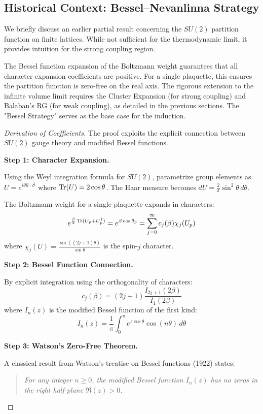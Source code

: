 \begin{remark}
\subsection{Historical Context: Bessel--Nevanlinna Strategy}
\label{sec:bessel-historical}
We briefly discuss an earlier partial result concerning the $SU(2)$ partition function on finite lattices. While not sufficient for the thermodynamic limit, it provides intuition for the strong coupling region.

\begin{remark}
The Bessel function expansion of the Boltzmann weight guarantees that all character expansion coefficients are positive. For a single plaquette, this ensures the partition function is zero-free on the real axis. The rigorous extension to the infinite volume limit requires the Cluster Expansion (for strong coupling) and Balaban's RG (for weak coupling), as detailed in the previous sections. The "Bessel Strategy" serves as the base case for the induction.
\end{remark}

\begin{proof}[Derivation of Coefficients]
The proof exploits the explicit connection between $SU(2)$ gauge theory and 
modified Bessel functions.

\textbf{Step 1: Character Expansion.}

Using the Weyl integration formula for $SU(2)$, parametrize group elements as 
$U = e^{i\theta \hat{n} \cdot \vec{\sigma}}$ where $\operatorname{Tr}(U) = 2\cos\theta$. The 
Haar measure becomes $dU = \frac{2}{\pi}\sin^2\theta \, d\theta$.

The Boltzmann weight for a single plaquette expands in characters:
\[
e^{\frac{\beta}{2}\operatorname{Tr}(U_p + U_p^\dagger)} = e^{\beta \cos\theta_p} = \sum_{j=0}^{\infty} c_j(\beta) \chi_j(U_p)
\]
where $\chi_j(U) = \frac{\sin((2j+1)\theta)}{\sin\theta}$ is the spin-$j$ character.

\textbf{Step 2: Bessel Function Connection.}

By explicit integration using the orthogonality of characters:
\[
c_j(\beta) = (2j+1) \frac{I_{2j+1}(2\beta)}{I_1(2\beta)}
\]
where $I_n(z)$ is the modified Bessel function of the first kind:
\[
I_n(z) = \frac{1}{\pi} \int_0^\pi e^{z\cos\theta} \cos(n\theta) \, d\theta
\]

\textbf{Step 3: Watson's Zero-Free Theorem.}

A classical result from Watson's treatise on Bessel functions (1922) states:
\begin{quote}
\textit{For any integer $n \geq 0$, the modified Bessel function $I_n(z)$ has 
no zeros in the right half-plane $\Re(z) > 0$.}
\end{quote}


\end{proof}
\end{remark}
